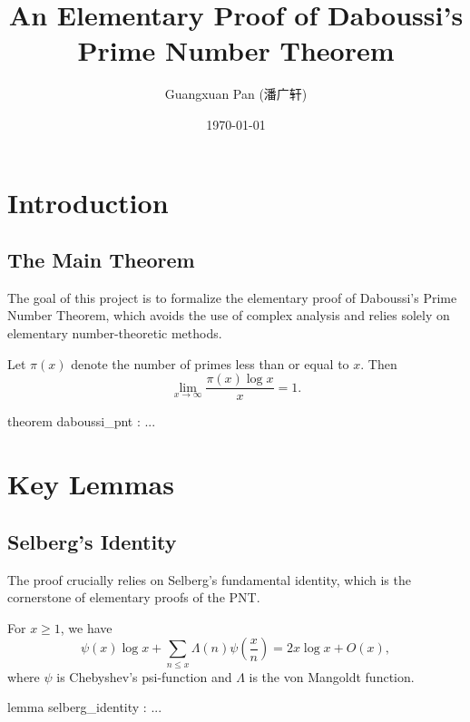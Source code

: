 \documentclass{report}
\title{An Elementary Proof of Daboussi's Prime Number Theorem}
\author{Guangxuan Pan (潘广轩)}
\date{\today}
\begin{document}
\maketitle
\tableofcontents

\chapter{Introduction}

\section{The Main Theorem}

The goal of this project is to formalize the elementary proof of Daboussi's Prime Number Theorem, which avoids the use of complex analysis and relies solely on elementary number-theoretic methods.

\begin{theorem}\label{thm:daboussi_pnt}
  Let $\pi(x)$ denote the number of primes less than or equal to $x$. Then
  \[
  \lim_{x \to \infty} \frac{\pi(x) \log x}{x} = 1.
  \]
\end{theorem}

\begin{leanok}
  theorem daboussi_pnt : ...
\end{leanok}

\chapter{Key Lemmas}

\section{Selberg's Identity}

The proof crucially relies on Selberg's fundamental identity, which is the cornerstone of elementary proofs of the PNT.

\begin{lemma}\label{lem:selberg}
  For $x \geq 1$, we have
  \[
  \psi(x) \log x + \sum_{n \leq x} \Lambda(n) \psi\left(\frac{x}{n}\right) = 2x \log x + O(x),
  \]
  where $\psi$ is Chebyshev's psi-function and $\Lambda$ is the von Mangoldt function.
\end{lemma}

\begin{leanok}
  lemma selberg_identity : ...
\end{leanok}
\end{document}
